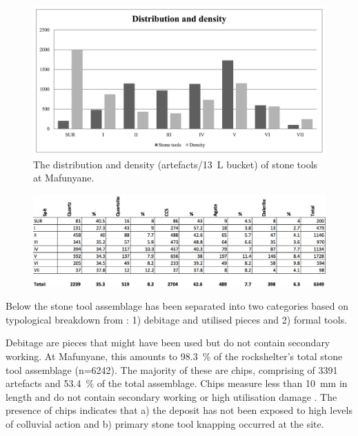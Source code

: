 	\begin{figure} %
		\includegraphics[width=\linewidth]{figures/Forssman-Figure04}
		\caption{The distribution and density (artefacts/\SI{13}{\liter} bucket) of stone tools at Mafunyane.}
		\label{fig:Forssman-Figure04}
	\end{figure}

	\begin{figure} %
		\includegraphics[width=\linewidth]{figures/Forssman-Table02}
		\label{fig:Forssman-Table02}
	\end{figure}

Below the stone tool assemblage has been separated into two categories based on typological breakdown from \textcite{Walker_1994} : 1) debitage and utilised pieces and 2) formal tools.

Debitage are  pieces that might have been used but do not contain secondary working. 
At Mafunyane, this amounts to \SI{98.3}{\percent} of the rockshelter’s total stone tool assemblage (n=\num{6242}). 
The majority of these are chips, comprising of \num{3391} artefacts and \SI{53.4}{\percent} of the total assemblage. 
Chips measure less than \SI{10}{\milli\meter}
  in length and do not contain secondary working or high utilisation damage \parencite[see][]{Deacon_1984a}. 
 The presence of chips indicates that a) the deposit has not been exposed to high levels of colluvial action \parencite{Kuman_2009} and b) primary stone tool knapping occurred at the site.

